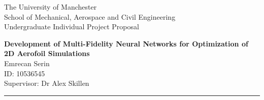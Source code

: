 \documentclass[12pt,letterpaper]{article}
\begin{document}
The University of Manchester \\
School of Mechanical, Aerospace and Civil Engineering\\  
Undergraduate Individual Project Proposal

\vspace{1cm}
 
\begin{center}\vspace{-1cm}
\textbf{\Large Development of Multi-Fidelity Neural Networks for Optimization  of 2D Aerofoil Simulations}\\ 
\vspace{0.3cm}
Emrecan Serin\\
ID: 10536545\\ 

Supervisor: Dr Alex Skillen
\end{center}

\vspace{-0.8cm}

\rule{\linewidth}{0.1mm}

\vspace{-0.9cm}
\end{document}
